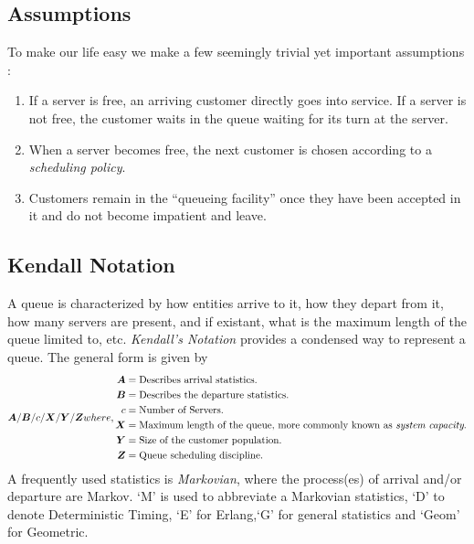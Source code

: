 \documentclass[11pt, a4paper]{report}
\begin{document}
\subsection{Assumptions}
To make our life easy we make a few seemingly trivial yet important assumptions \cite{myReference}:
\begin{enumerate}
    \item If a server is free, an arriving customer directly goes into service. If a server is not free, the customer waits in the queue waiting for its turn at the server. 
    \item When a server becomes free, the next customer is chosen according to a \emph{scheduling policy}.
    \item Customers remain in the ``queueing facility'' once they have been accepted in it and do not become impatient and leave.
\end{enumerate}

\subsection{Kendall Notation}
A queue is characterized by how entities arrive to it, how they depart from it, how many servers are present, and if existant, what is the maximum length of the queue limited to, etc. \emph{Kendall's Notation} provides a condensed way to represent a queue. The general form is given by 
\begin{subequations}
    \begin{align}
        \mA/ \mB/ c/ \mX/ \mY/ \mZ 
    \end{align}
    where, 
    \begin{align*}
        \mA &= \text{Describes arrival statistics.}\\
        \mB &= \text{Describes the departure statistics.} \\
        c &= \text{Number of Servers.}\\
        \mX &= \text{Maximum length of the queue, more commonly known as \emph{system capacity}.}\\
        \mY &= \text{Size of the customer population}. \\
        \mZ &= \text{Queue scheduling discipline.}
    \end{align*}
\end{subequations}
A frequently used statistics is \emph{Markovian}, where the process(es) of arrival and/or departure are Markov. `M' is used to abbreviate a Markovian statistics, `D' to denote Deterministic Timing, `E' for Erlang,`G' for general statistics and `Geom' for Geometric. 
\end{document}
